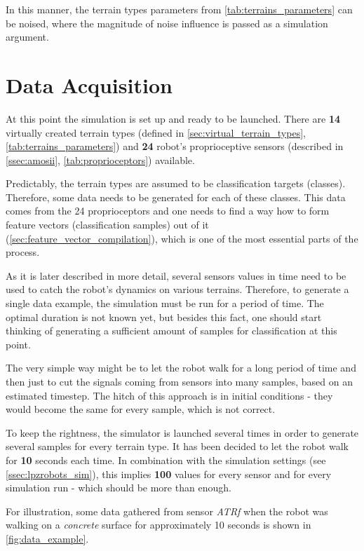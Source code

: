 In this manner, the terrain types parameters from \cref{tab:terrains_parameters} can be noised, where the magnitude of noise influence is passed as a simulation argument.

\section{Data Acquisition} \label{sec:data_acquisition}
At this point the simulation is set up and ready to be launched. There are \textbf{14} virtually created terrain types (defined in \cref{sec:virtual_terrain_types}, \cref{tab:terrains_parameters}) and \textbf{24} robot's proprioceptive sensors (described in \cref{ssec:amosii}, \cref{tab:proprioceptors}) available.

Predictably, the terrain types are assumed to be classification targets (classes). Therefore, some data needs to be generated for each of these classes. This data comes from the 24 proprioceptors and one needs to find a way how to form feature vectors (classification samples) out of it (\cref{sec:feature_vector_compilation}), which is one of the most essential parts of the process.

As it is later described in more detail, several sensors values in time need to be used to catch the robot's dynamics on various terrains. Therefore, to generate a single data example, the simulation must be run for a period of time. The optimal duration is not known yet, but besides this fact, one should start thinking of generating a sufficient amount of samples for classification at this point.

The very simple way might be to let the robot walk for a long period of time and then just to cut the signals coming from sensors into many samples, based on an estimated timestep. The hitch of this approach is in initial conditions - they would become the same for every sample, which is not correct.

To keep the rightness, the simulator is launched several times in order to generate several samples for every terrain type. It has been decided to let the robot walk for \textbf{10} seconds each time. In combination with the simulation settings (see \cref{ssec:lpzrobots_sim}), this implies \textbf{100} values for every sensor and for every simulation run - which should be more than enough.

For illustration, some data gathered from sensor \textit{ATRf} when the robot was walking on a \textit{concrete} surface for approximately 10 seconds is shown in \cref{fig:data_example}.

